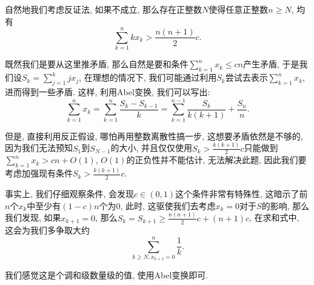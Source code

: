\documentclass[lang=cn,12pt,thmcnt=section]{elegantbook}
\begin{document}
\begin{analysis}
自然地我们考虑反证法, 如果不成立, 那么存在正整数$N$使得任意正整数$n \ge N$, 均有
\[
\sum\limits_{k=1}^n kx_k> \frac{n(n+1)}{2}c.
\]

既然我们是要从这里推矛盾, 那么自然是要和条件$\sum\limits_{k=1}^n x_k\le cn$产生矛盾, 于是我们设$S_k=\sum\limits_{j=1}^k jx_j$, 在理想的情况下, 我们可能通过利用$S_k$尝试去表示$\sum\limits_{k=1}^n x_k$, 进而得到一些矛盾. 这样, 利用Abel变换, 我们可以写出: 
\[
\sum_{k=1}^n x_k=\sum_{k=1}^n \frac{S_k-S_{k-1}}{k}=\sum_{k=1}^{n-1}\frac{S_k}{k(k+1)}+\frac{S_n}{n}.
\]

但是, 直接利用反正假设, 哪怕再用整数离散性搞一步, 这想要矛盾依然是不够的, 因为我们无法预知$S_1$到$S_{N-1}$的大小, 并且仅仅使用$S_k>\frac{k(k+1)}{2}c$只能做到$\sum_{k=1}^n x_k>cn+O(1)$, $O(1)$的正负性并不能估计, 无法解决此题, 因此我们要考虑加强现有条件$S_k>\frac{k(k+1)}{2}c$.

事实上, 我们仔细观察条件, 会发现$c\in (0,1)$这个条件非常有特殊性, 这暗示了前$n$个$x_k$中至少有$(1-c)n$个为$0$, 此时, 这驱使我们去考虑$x_k=0$对于$S$的影响, 那么我们发现, 如果$x_{k+1}=0$, 那么$S_{k}=S_{k+1}\ge \frac{n(n+1)}{2}c+(n+1)c$, 在求和式中, 这会为我们多争取大约
\[
\sum_{k\ge N,x_{k+1}=0}^n\frac{1}{k}
.\]

我们感觉这是个调和级数量级的值, 使用Abel变换即可.
\end{analysis}
\end{document}
